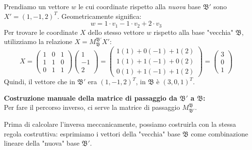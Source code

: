 \begin{richiamo}
        Prendiamo un vettore $w$ le cui coordinate rispetto alla \textit{nuova} base $\mathfrak{B}'$ sono $X' = (1, -1, 2)^T$. Geometricamente significa:
        \[
        w = 1 \cdot v_1 - 1 \cdot v_2 + 2 \cdot v_3
        \]
        Per trovare le coordinate $X$ dello stesso vettore $w$ rispetto alla base "vecchia" $\mathfrak{B}$, utilizziamo la relazione $X = M_{\mathfrak{B}}^{\mathfrak{B}'} X'$:
        \[
        X = \begin{pmatrix} 
        1 & 0 & 1 \\ 
        1 & 1 & 0 \\ 
        0 & 1 & 1 
        \end{pmatrix} 
        \begin{pmatrix} 1 \\ -1 \\ 2 \end{pmatrix} = 
        \begin{pmatrix} 
        1(1) + 0(-1) + 1(2) \\ 
        1(1) + 1(-1) + 0(2) \\ 
        0(1) + 1(-1) + 1(2) 
        \end{pmatrix} = 
        \begin{pmatrix} 3 \\ 0 \\ 1 \end{pmatrix}
        \]
        Quindi, il vettore che in $\mathfrak{B}'$ era $(1, -1, 2)^T$, in $\mathfrak{B}$ è $(3, 0, 1)^T$. 

        \vspace{0.3cm}
        \textbf{Costruzione manuale della matrice di passaggio da $\mathfrak{B}'$ a $\mathfrak{B}$:} \\
        Per fare il percorso inverso, ci serve la matrice di passaggio $M_{\mathfrak{B}'}^{\mathfrak{B}}$. 
        
        Prima di calcolare l'inversa meccanicamente, possiamo costruirla con la stessa regola costruttiva: esprimiamo i vettori della "vecchia" base $\mathfrak{B}$ come combinazione lineare della "nuova" base $\mathfrak{B}'$.
        

\end{richiamo}
